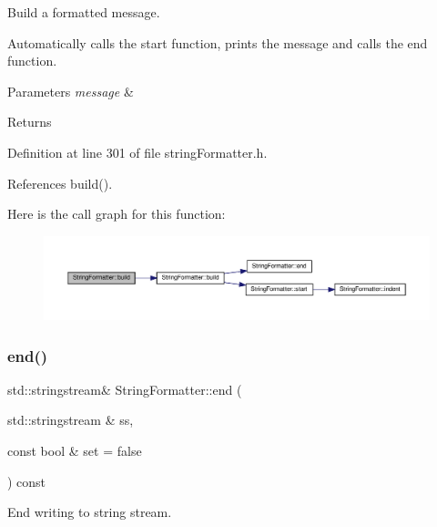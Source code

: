 Build a formatted message. 

Automatically calls the start function, prints the message and calls the end function.


\begin{DoxyParams}{Parameters}
{\em message} & \\
\hline
\end{DoxyParams}
\begin{DoxyReturn}{Returns}

\end{DoxyReturn}


Definition at line 301 of file string\+Formatter.\+h.



References build().

Here is the call graph for this function\+:
\nopagebreak
\begin{figure}[H]
\begin{center}
\leavevmode
\includegraphics[width=350pt]{classStringFormatter_a49080dfd01d9fbca9efab8a8a955ab76_cgraph}
\end{center}
\end{figure}
\mbox{\label{classStringFormatter_a951e3aff962bfb69cf745c5b05de26cc}} 
\subsubsection{\texorpdfstring{end()}{end()}\hspace{0.1cm}{\footnotesize\ttfamily [1/2]}}
{\footnotesize\ttfamily std\+::stringstream\& String\+Formatter\+::end (\begin{DoxyParamCaption}\item[{std\+::stringstream \&}]{ss,  }\item[{const bool \&}]{set = {\ttfamily false} }\end{DoxyParamCaption}) const\hspace{0.3cm}{\ttfamily [inline]}}



End writing to string stream. 

